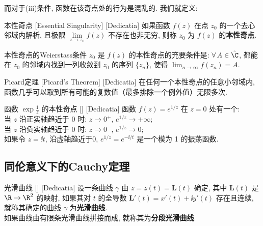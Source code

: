 \documentclass[UTF8]{ctexart}
\begin{document}
        而对于(iii)条件, 函数在该奇点处的行为是混乱的. 我们就定义: 

        \begin{dfn}
            [EssentialSingularity]
            {本性奇点}
            [Essential Singularity]
            [Dedicatia]
            如果函数 \(f(z)\) 在点 \(z_0\) 的一个去心邻域内解析, 且极限 \(\lim\limits_{z \to z_0} f(z)\) 不存在也非无穷, 则称 \(z_0\) 为 \(f(z)\) 的\textbf{本性奇点}. 
        \end{dfn}

        \begin{thm}
            {本性奇点的Weierstass条件}
            \(z_0\) 是 \(f(z)\) 的本性奇点的充要条件是:  \(\forall\,A\in\hat{\C}\), 都能在 \(z_0\) 的邻域内找到一列收敛到 \(z_0\) 的序列 \(\{z_n\}\), 使得 \(\lim_{n\to\infty}f(z_n)=A\).
        \end{thm}

        \begin{thm}
            [UUID]
            {Picard定理}
            [Picard's Theorem]
            [Dedicatia]
            在任何一个本性奇点的任意小邻域内, 函数几乎可以取到所有可能的复数值（最多排除一个例外值）无限多次. 
        \end{thm}

        \begin{xmp}
            [UUID]
            {函数 \(\exp\frac{1}{z}\) 的本性奇点}
            []
            [Dedicatia]
            函数 \(f(z) = e^{1/z}\) 在 \(z=0\) 处有一个\EssentialSingularity :\\
            当 \(z\) 沿正实轴趋近于 0 时: \(z \to 0^+\), \(e^{1/z} \to +\infty\);\\ 
            当 \(z\) 沿负实轴趋近于 0 时: \(z \to 0^-\), \(e^{1/z} \to 0\);\\
            如果令 \(z =\ii t\), 沿虚轴趋近于0, \(e^{1/z} = e^{-\ii/t}\) 是一个模为 1 的振荡函数.
        \end{xmp}

    \subsection{同伦意义下的Cauchy定理}

        \begin{dfn}
            [UUID]
            {光滑曲线}
            []
            [Dedicatia]
            设一条曲线 \(\gamma\) 由 \(z=z(t)=\bm{L}(t)\) 确定, 其中 \(\bm{L}(t)\) 是 \(\R\to\R^2\) 的映射, 如果其对 \(t\) 的全导数 \(\bm{L}'(t)=x'(t)+\ii y'(t)\) 存在且连续, 就称其确定的曲线 \(\gamma\) 为\textbf{光滑曲线}. \\
            如果曲线由有限条光滑曲线拼接而成, 就称其为\textbf{分段光滑曲线}. 
        \end{dfn}
\end{document}
